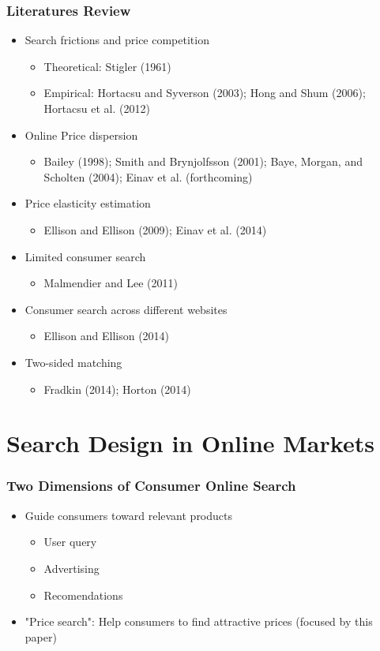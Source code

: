 \documentclass{beamer}
\begin{document}
\begin{frame}[allowframebreaks]
\frametitle{Literatures Review}
\begin{itemize}
\item Search frictions and price competition
  \begin{itemize}
  \item Theoretical: Stigler (1961)
  \item Empirical: Hortacsu and Syverson (2003); Hong and Shum (2006); Hortacsu et al. (2012)
  \end{itemize}
\item Online Price dispersion
  \begin{itemize} 
  \item Bailey (1998); Smith and Brynjolfsson (2001); Baye, Morgan, and Scholten (2004); Einav et al. (forthcoming)
  \end{itemize}
\item Price elasticity estimation
  \begin{itemize}
  \item Ellison and Ellison (2009); Einav et al. (2014)
  \end{itemize}
\framebreak
\item Limited consumer search
  \begin{itemize}
  \item Malmendier and Lee (2011)
  \end{itemize}
\item Consumer search across different websites
  \begin{itemize}
  \item Ellison and Ellison (2014)
  \end{itemize}
\item Two-sided matching
  \begin{itemize}
  \item Fradkin (2014); Horton (2014)
  \end{itemize}
\end{itemize} 
\end{frame}

\section{Search Design in Online Markets}
\begin{frame}
\frametitle{Two Dimensions of Consumer Online Search}
\begin{itemize}
\item Guide consumers toward relevant products
  \begin{itemize}
  \item User query
  \item Advertising
  \item Recomendations
  \end{itemize}
\item "Price search": Help consumers to find attractive prices (focused by this paper)
\end{itemize}
\end{frame}
\end{document}
